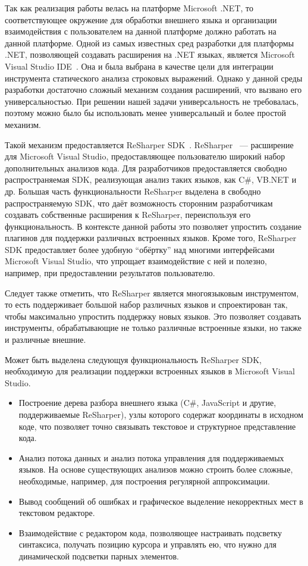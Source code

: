     Так как реализация работы велась на платформе Microsoft .NET, то соответствующее окружение для обработки внешнего языка и организации взаимодействия с пользователем на данной платформе должно работать на данной платформе. Одной из самых известных сред разработки для платформы .NET, позволяющей создавать расширения на .NET языках, является Microsoft Visual Studio IDE~\cite{MSVSIDE}. Она и была выбрана в качестве цели для интеграции инструмента статического анализа строковых выражений. Однако у данной среды разработки достаточно сложный механизм создания расширений, что вызвано его универсальностью. При решении нашей задачи универсальность не требовалась, поэтому можно было бы использовать менее универсальный и более простой механизм.

Такой механизм предоставляется ReSharper SDK~\cite{ReSharperSDK}.  ReSharper~\cite{ReSharper} --- расширение для Microsoft Visual Studio, предоставляющее пользователю широкий набор дополнительных анализов кода. Для разработчиков предоставляется свободно распространяемая SDK, реализующая анализ таких языков, как C\#, VB.NET и др. Большая часть функциональности ReSharper выделена в свободно распространяемую SDK, что даёт возможность сторонним разработчикам создавать собственные расширения к ReSharper, переиспользуя его функциональность. В контексте данной работы это позволяет упростить создание плагинов для поддержки различных встроенных языков. Кроме того, ReSharper SDK предоставляет более удобную ``обёртку'' над многими интерфейсами Microsoft Visual Studio, что упрощает взаимодействие с ней и полезно, например, при предоставлении результатов пользователю.

Следует также отметить, что ReSharper является многоязыковым инструментом, то есть поддерживает большой набор различных языков и спроектирован так, чтобы максимально упростить поддержку новых языков. Это позволяет создавать инструменты, обрабатывающие не только различные встроенные языки, но также и различные внешние.

Может быть выделена следующуя функциональность ReSharper SDK, необходимую для реализации поддержки встроенных языков в Microsoft Visual Studio.  
\begin{itemize}
    \item Построение дерева разбора внешнего языка (C\#, JavaScript и другие, поддерживаемые ReSharper), узлы которого содержат координаты в исходном коде, что позволяет точно связывать текстовое и структурное представление кода.
    \item Анализ потока данных и анализ потока управления для поддерживаемых языков. На основе существующих анализов можно строить более сложные, необходимые, например, для построения регулярной аппроксимации.
    \item Вывод сообщений об ошибках и графическое выделение некорректных мест в текстовом редакторе.
    \item Взаимодействие с редактором кода, позволяющее настраивать подсветку синтаксиса, получать позицию курсора и управлять ею, что нужно для динамической подсветки парных элементов.
\end{itemize}

